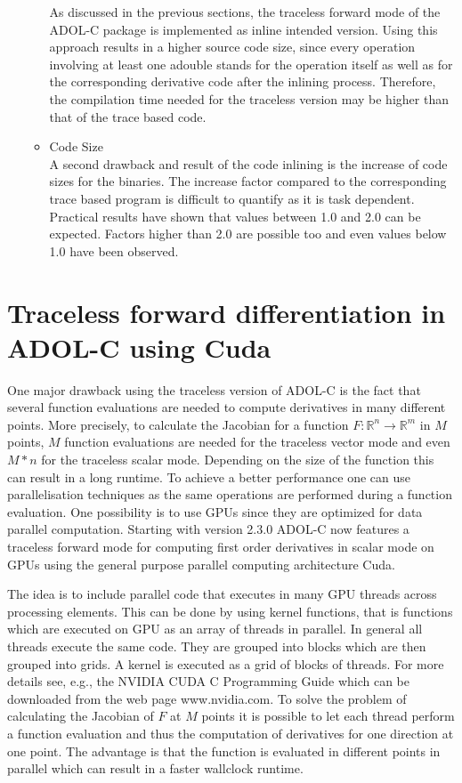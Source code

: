 \documentclass[11pt,twoside]{article}
\begin{document}
\begin{itemize}
\begin{itemize}
      As discussed in the previous sections, the traceless forward mode of
      the ADOL-C package is implemented as inline intended version. Using
      this approach results in a higher source code size, since every
      operation involving at least one {\sf adouble} stands for the
      operation itself as well as for the corresponding derivative
      code after the inlining process. Therefore, the compilation time
      needed for the traceless version may be higher than that of the trace based code. 
    \item Code Size\\
      A second drawback and result of the code inlining is the
      increase of code sizes for the binaries. The increase
      factor compared to the corresponding trace based program is
      difficult to quantify as it is task dependent. Practical results
      have shown that values between 1.0 and 2.0 can be
      expected. Factors higher than 2.0 are possible too and even
      values below 1.0 have been observed. 
    \end{itemize}
\end{itemize}


\section{Traceless forward differentiation in ADOL-C using Cuda}
\label{tracelessCuda}
%
One major drawback using the traceless version of ADOL-C is the fact 
that several function evaluations are needed to compute derivatives
in many different points. More precisely, to calculate the Jacobian for
a function $F:\mathbb{R}^n\rightarrow \mathbb{R}^m$ in $M$ points, $M$
function evaluations are needed for the traceless vector mode and even 
$M*n$ for the traceless scalar mode. Depending on the size of the function 
this can result in a long runtime. To achieve a better performance one can
use parallelisation techniques as the same operations are
performed during a function evaluation. One possibility is to use GPUs 
since they are optimized for data parallel computation. Starting with 
version 2.3.0 ADOL-C now features a traceless forward mode for computing 
first order derivatives in scalar mode on GPUs using the 
general purpose parallel computing architecture Cuda. 

The idea is to include parallel code that executes in many GPU threads across
processing elements. This can be done by using kernel functions, that is functions
which are executed on GPU as an array of threads in parallel. In general all 
threads execute the same code. They are grouped into blocks which are then grouped 
into grids. A kernel is executed as a grid of blocks of threads. For more 
details see, e.g., the NVIDIA CUDA C Programming Guide which can be downloaded from 
the web page {\sf www.nvidia.com}. To solve the problem of calculating 
the Jacobian of $F$ at $M$ points it is possible to let each thread perform a 
function evaluation and thus the computation of derivatives for one direction 
at one point. The advantage is that the function is evaluated in different points
in parallel which can result in a faster wallclock runtime.
\end{document}
